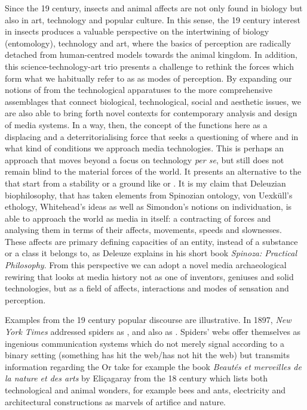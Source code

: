 {Since the 19 century, insects and animal affects are not only
found in biology but also in art, technology and popular culture. In
this sense, the 19 century interest in insects produces a
valuable perspective on the intertwining of biology (entomology),
technology and art, where the basics of perception are radically
detached from human{}-centred models towards the animal kingdom. In
addition, this science{}-technology{}-art trio presents a challenge to
rethink the forces which form what we habitually refer to as  as
modes of perception. By expanding our notions of  from the
technological apparatuses to the more comprehensive assemblages that
connect biological, technological, social and aesthetic issues, we are
also able to bring forth novel contexts for contemporary analysis and
design of media systems. In a way, then, the concept of the 
functions here as a displacing and a deterritorialising force that
seeks a questioning of where and in what kind of conditions we approach
media technologies. This is perhaps an approach that moves beyond a
focus on technology {\em per se}, but still does
not remain blind to the material forces of the world. It presents an
alternative to the  that start from a stability
or a ground like  or . It is my claim that
Deleuzian biophilosophy, that has taken elements from Spinozian
ontology, von Uexk\"ull's ethology, Whitehead's ideas as well as
Simondon's notions on individuation, is able to approach the world as
media in itself: a contracting of forces and analysing them in terms of
their affects, movements, speeds and slownesses. These affects are
primary defining capacities of an entity, instead of a substance or a
class it belongs to, as Deleuze explains in his short book
{\em Spinoza: Practical Philosophy}. From this
perspective we can adopt a novel media archaeological rewiring that
looks at media history not as one of inventors, geniuses and solid
technologies, but as a field of affects, interactions and modes of
sensation and perception.

Examples from the 19 century popular discourse are illustrative. In
1897, {\em New York Times} addressed spiders as , and also as . Spiders' webs offer themselves as ingenious communication
systems which do not merely signal according to a binary setting
(something has hit the web/has not hit the web) but transmits
information regarding the  Or take for example the book {\em Beaut\'es
et merveilles de la nature et des arts} by Eli\c{c}agaray from the
18 century which lists both technological and
animal wonders, for example bees and ants, electricity and
architectural constructions as marvels of artifice and nature. 

}
